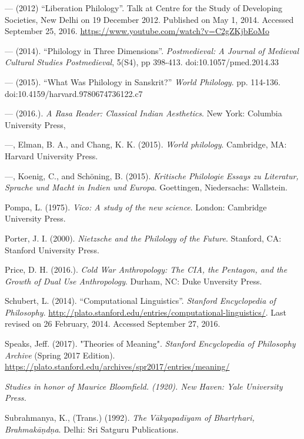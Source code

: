 \begin{thebibliography}{99}
  — (2012) “Liberation Philology”. Talk at Centre for the Study of Developing Societies, New Delhi on 19 December 2012. Published on May 1, 2014. Accessed September 25, 2016. \url{https://www.youtube.com/watch?v=C2gZKjbEoMo}

  — (2014). “Philology in Three Dimensions”. \textit{Postmedieval: A Journal of Medieval Cultural Studies Postmedieval}, 5(S4), pp 398-413. doi:10.1057/pmed.2014.33

  — (2015). “What Was Philology in Sanskrit?” \textit{World Philology}. pp. 114-136. doi:10.4159/harvard.9780674736122.c7

  — (2016.). \textit{A Rasa Reader: Classical Indian Aesthetics}. New York: Columbia University Press,

  —, Elman, B. A., and Chang, K. K. (2015). \textit{World philology}. Cambridge, MA: Harvard University Press.

  —, Koenig, C., and Schöning, B. (2015). \textit{Kritische Philologie Essays zu Literatur, Sprache und Macht in Indien und Europa}. Goettingen, Niedersachs: Wallstein.

  Pompa, L. (1975). \textit{Vico: A study of the new science}. London: Cambridge University Press.

  Porter, J. I. (2000). \textit{Nietzsche and the Philology of the Future}. Stanford, CA: Stanford University Press.

  Price, D. H. (2016.). \textit{Cold War Anthropology: The CIA, the Pentagon, and the Growth of Dual Use Anthropology}. Durham, NC: Duke Unversity Press.

  Schubert, L. (2014). “Computational Linguistics”. \textit{Stanford Encyclopedia of Philosophy}. \url{http://plato.stanford.edu/entries/computational-linguistics/}. Last revised on 26 February, 2014. Accessed September 27, 2016.

  Speaks, Jeff. (2017). "Theories of Meaning". \textit{Stanford Encyclopedia of Philosophy Archive} (Spring 2017 Edition). \url{https://plato.stanford.edu/archives/spr2017/entries/meaning/}

  \textit{Studies in honor of Maurice Bloomfield. (1920). New Haven: Yale University Press.}

  Subrahmanya, K., (Trans.) (1992). \textit{The Vākyapadīyam of Bhartṛhari, Brahmakāṇdṇa}. Delhi: Sri Satguru Publications.


\end{thebibliography}
